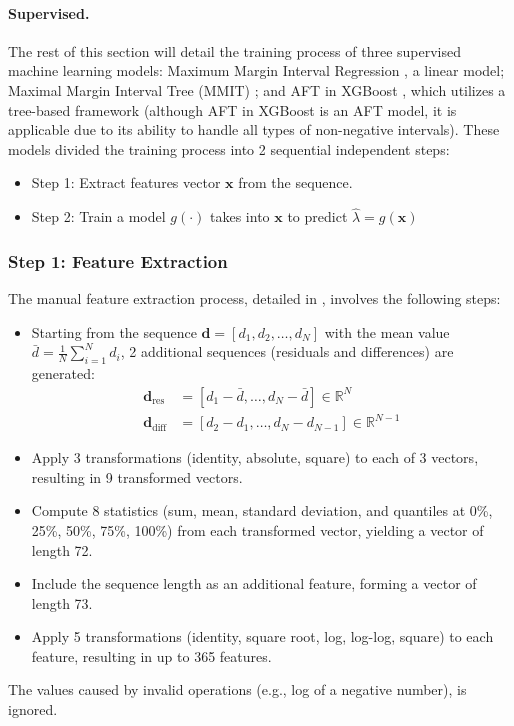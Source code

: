 \documentclass[12pt]{article}
\begin{document}
\paragraph{Supervised.} The rest of this section will detail the training process of three supervised machine learning models: Maximum Margin Interval Regression \citep{rigaill:13}, a linear model; Maximal Margin Interval Tree (MMIT) \citep{mmit}; and AFT in XGBoost \citep{aft_xgboost}, which utilizes a tree-based framework (although AFT in XGBoost is an AFT model, it is applicable due to its ability to handle all types of non-negative intervals).
These models divided the training process into 2 sequential independent steps:
\begin{itemize}
    \item Step 1: Extract features vector $\mathbf{x}$ from the sequence.
    \item Step 2: Train a model $g(\cdot)$ takes into $\mathbf{x}$ to predict $\hat{\lambda} = g(\mathbf{x})$
\end{itemize}

\subsubsection{Step 1: Feature Extraction}
The manual feature extraction process, detailed in \cite{rigaill:13}, involves the following steps:
\begin{itemize}
    \item Starting from the sequence $\mathbf{d} = [d_1, d_2, \dots, d_N]$ with the mean value $\bar{d} = \frac{1}{N} \sum_{i=1}^N d_i$, 2 additional sequences (residuals and differences) are generated:
    \begin{align*}
        \mathbf{d}_{\text{res}} &= [d_1 - \bar{d}, \dots, d_N - \bar{d}] \in \mathbb{R}^N \\
        \mathbf{d}_{\text{diff}} &= [d_2 - d_1, \dots, d_N - d_{N-1}] \in \mathbb{R}^{N-1}
    \end{align*}

    \item Apply 3 transformations (identity, absolute, square) to each of 3 vectors, resulting in 9 transformed vectors.
    \item Compute 8 statistics (sum, mean, standard deviation, and quantiles at 0\%, 25\%, 50\%, 75\%, 100\%) from each transformed vector, yielding a vector of length 72.
    \item Include the sequence length as an additional feature, forming a vector of length 73.
    \item Apply 5 transformations (identity, square root, log, log-log, square) to each feature, resulting in up to 365 features.
\end{itemize}
The values caused by invalid operations (e.g., log of a negative number), is ignored.
\end{document}
